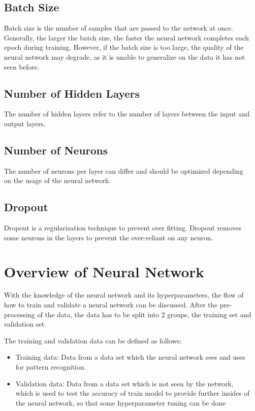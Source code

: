 \documentclass{tum-book}
\begin{document}
        \newpage\subsection{Batch Size}
        Batch size is the number of samples that are passed to the network at once. Generally, the larger the batch size, the faster the neural network completes each epoch during training. However, if the batch size is too large, the quality of the neural network may degrade, as it is unable to generalize on the data it has not seen before.
        
        \subsection{Number of Hidden Layers}
        The number of hidden layers refer to the number of layers between the input and output layers.
        
        \subsection{Number of Neurons}
        The number of neurons per layer can differ and should be optimized depending on the usage of the neural network.

        \subsection{Dropout}
        Dropout is a regularization technique to prevent over fitting. Dropout removes some neurons in the layers to prevent the over-reliant on any neuron.

    \newpage\section{Overview of Neural Network}
    With the knowledge of the neural network and its hyperparameters, the flow of how to train and validate a neural network can be discussed. After the pre-processing of the data, the data has to be split into 2 groups, the training set and validation set. 
    
        \bigskip\noindent
        The training and validation data can be defined as follows:
        \begin{itemize}
             \item Training data: Data from a data set which the neural network sees and uses for pattern recognition. 
            \item Validation data: Data from a data set which is not seen by the network, which is used to test the accuracy of train model to provide further insides of the neural network, so that some hyperparameter tuning can be done
        \end{itemize}
        
\end{document}
